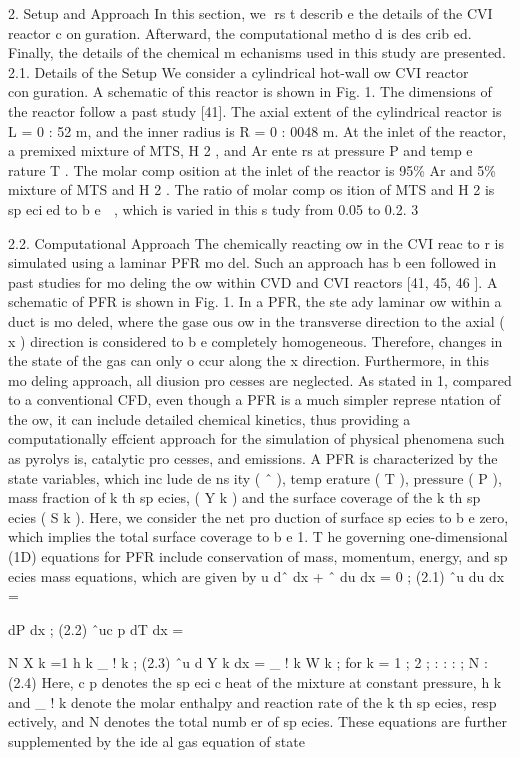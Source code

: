 \documentclass[10pt, letterpaper]{article}
\begin{document}
2. Setup and Approach
In this section, we rs t describ e the details of the CVI reactor c onguration. Afterward, the computational
metho d is des crib ed. Finally, the details of the chemical m echanisms used in this study are presented.
2.1. Details of the Setup
We consider a cylindrical hot-wall 
ow CVI reactor conguration. A schematic of this reactor is shown in
Fig. 1. The dimensions of the reactor follow a past study [41]. The axial extent of the cylindrical reactor is
L
= 0
:
52 m, and the inner radius is
R
= 0
:
0048 m. At the inlet of the reactor, a premixed mixture of MTS,
H
2
, and Ar ente rs at pressure
P
and temp e rature
T
. The molar comp osition at the inlet of the reactor is
95\% Ar and 5\% mixture of MTS and H
2
. The ratio of molar comp os ition of MTS and H
2
is sp ecied to b e

, which is varied in this s tudy from 0.05 to 0.2.
3


2.2. Computational Approach
The chemically reacting 
ow in the CVI reac to r is simulated using a laminar PFR mo del. Such an
approach has b een followed in past studies for mo deling the 
ow within CVD and CVI reactors [41, 45, 46 ].
A schematic of PFR is shown in Fig. 1. In a PFR, the ste ady laminar 
ow within a duct is mo deled,
where the gase ous 
ow in the transverse direction to the axial (
x
) direction is considered to b e completely
homogeneous. Therefore, changes in the state of the gas can only o ccur along the
x
direction. Furthermore,
in this mo deling approach, all diusion pro cesses are neglected. As stated in 1, compared to a conventional
CFD, even though a PFR is a much simpler represe ntation of the 
ow, it can include detailed chemical
kinetics, thus providing a computationally effcient approach for the simulation of physical phenomena such
as pyrolys is, catalytic pro cesses, and emissions.
A PFR is characterized by the state variables, which inc lude de ns ity (
ˆ
), temp erature (
T
), pressure (
P
),
mass fraction of
k
th
sp ecies, (
Y
k
) and the surface coverage of the
k
th
sp ecies (
S
k
). Here, we consider the
net pro duction of surface sp ecies to b e zero, which implies the total surface coverage to b e 1. T he governing
one-dimensional (1D) equations for PFR include conservation of mass, momentum, energy, and sp ecies mass
equations, which are given by
u
dˆ
dx
+
ˆ
du
dx
= 0
;
(2.1)
ˆu
du
dx
=

dP
dx
;
(2.2)
ˆuc
p
dT
dx
=

N
X
k
=1
h
k
\_
!
k
;
(2.3)
ˆu
d Y
k
dx
= \_
!
k
W
k
;
for
k
= 1
;
2
; : : : ; N :
(2.4)
Here,
c
p
denotes the sp ecic heat of the mixture at constant pressure,
h
k
and \_
!
k
denote the molar enthalpy
and reaction rate of the
k
th
sp ecies, resp ectively, and
N
denotes the total numb er of sp ecies. These equations
are further supplemented by the ide al gas equation of state
\end{document}
